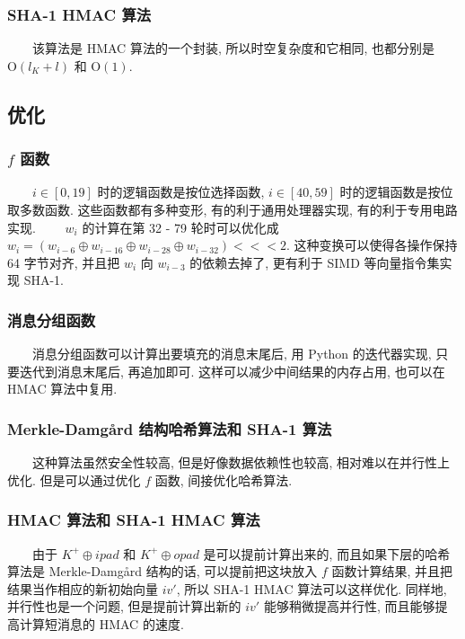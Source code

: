 \documentclass[12pt,a4paper]{article}
\begin{document}
\subsubsection*{SHA-1 HMAC 算法}
　　该算法是 HMAC 算法的一个封装, 所以时空复杂度和它相同, 也都分别是 $ \mathrm{O}(l_K + l) $ 和 $ \mathrm{O}(1) $. 

\subsection*{优化}

\subsubsection*{$ f $ 函数}

　　$ i \in [0, 19] $ 时的逻辑函数是按位选择函数, $ i \in [40, 59] $ 时的逻辑函数是按位取多数函数. 这些函数都有多种变形, 有的利于通用处理器实现, 有的利于专用电路实现. 
\newline
　　$ w_i $ 的计算在第 32 - 79 轮时可以优化成 $ w_i = (w_{i - 6} \oplus w_{i - 16} \oplus w_{i - 28} \oplus w_{i - 32}) <<< 2 $. 这种变换可以使得各操作保持 64 字节对齐, 并且把 $ w_i $ 向 $ w_{i - 3} $ 的依赖去掉了, 更有利于 SIMD 等向量指令集实现 SHA-1. 

\subsubsection*{消息分组函数}

　　消息分组函数可以计算出要填充的消息末尾后, 用 Python 的迭代器实现, 只要迭代到消息末尾后, 再追加即可. 这样可以减少中间结果的内存占用, 也可以在 HMAC 算法中复用. 

\subsubsection*{Merkle-Damgård 结构哈希算法和 SHA-1 算法}

　　这种算法虽然安全性较高, 但是好像数据依赖性也较高, 相对难以在并行性上优化. 但是可以通过优化 $ f $ 函数, 间接优化哈希算法. 

\subsubsection*{HMAC 算法和 SHA-1 HMAC 算法}

　　由于 $ K^+ \oplus ipad $ 和 $ K^+ \oplus opad $ 是可以提前计算出来的, 而且如果下层的哈希算法是 Merkle-Damgård 结构的话, 可以提前把这块放入 $ f $ 函数计算结果, 并且把结果当作相应的新初始向量 $ iv' $, 所以 SHA-1 HMAC 算法可以这样优化. 同样地, 并行性也是一个问题, 但是提前计算出新的 $ iv' $ 能够稍微提高并行性, 而且能够提高计算短消息的 HMAC 的速度. 
\end{document}
